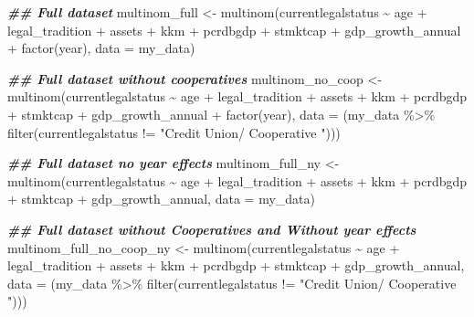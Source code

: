 \documentclass[a4paper,nobind]{templates/ociamthesis}
\newenvironment{Shaded}{\begin{snugshade}}{\end{snugshade}}
\newcommand{\AttributeTok}[1]{\textcolor[rgb]{0.77,0.63,0.00}{#1}}
\newcommand{\DocumentationTok}[1]{\textcolor[rgb]{0.56,0.35,0.01}{\textbf{\textit{#1}}}}
\newcommand{\FunctionTok}[1]{\textcolor[rgb]{0.00,0.00,0.00}{#1}}
\newcommand{\NormalTok}[1]{#1}
\newcommand{\OtherTok}[1]{\textcolor[rgb]{0.56,0.35,0.01}{#1}}
\newcommand{\SpecialCharTok}[1]{\textcolor[rgb]{0.00,0.00,0.00}{#1}}
\newcommand{\StringTok}[1]{\textcolor[rgb]{0.31,0.60,0.02}{#1}}
\renewenvironment{Shaded}
{
  \vspace{10pt}%
  \begin{snugshade}%
}{%
  \end{snugshade}%
  \vspace{8pt}%
}
\begin{document}
\begin{Shaded}
\begin{Highlighting}[]
\DocumentationTok{\#\# Full dataset}
\NormalTok{multinom\_full }\OtherTok{\textless{}{-}} \FunctionTok{multinom}\NormalTok{(currentlegalstatus }\SpecialCharTok{\textasciitilde{}}\NormalTok{ age }\SpecialCharTok{+}\NormalTok{ legal\_tradition }\SpecialCharTok{+}\NormalTok{ assets }\SpecialCharTok{+}\NormalTok{ kkm }\SpecialCharTok{+}\NormalTok{ pcrdbgdp }\SpecialCharTok{+}\NormalTok{ stmktcap }\SpecialCharTok{+}\NormalTok{ gdp\_growth\_annual }\SpecialCharTok{+} \FunctionTok{factor}\NormalTok{(year), }\AttributeTok{data =}\NormalTok{ my\_data)}

\DocumentationTok{\#\# Full dataset without cooperatives}
\NormalTok{multinom\_no\_coop }\OtherTok{\textless{}{-}} \FunctionTok{multinom}\NormalTok{(currentlegalstatus }\SpecialCharTok{\textasciitilde{}}\NormalTok{ age }\SpecialCharTok{+}\NormalTok{ legal\_tradition }\SpecialCharTok{+}\NormalTok{ assets }\SpecialCharTok{+}\NormalTok{ kkm }\SpecialCharTok{+}\NormalTok{ pcrdbgdp }\SpecialCharTok{+}\NormalTok{ stmktcap }\SpecialCharTok{+}\NormalTok{ gdp\_growth\_annual }\SpecialCharTok{+} \FunctionTok{factor}\NormalTok{(year), }\AttributeTok{data =}\NormalTok{ (my\_data }\SpecialCharTok{\%\textgreater{}\%} \FunctionTok{filter}\NormalTok{(currentlegalstatus }\SpecialCharTok{!=} \StringTok{"Credit Union/ Cooperative "}\NormalTok{)))}

\DocumentationTok{\#\# Full dataset no year effects}
\NormalTok{multinom\_full\_ny }\OtherTok{\textless{}{-}} \FunctionTok{multinom}\NormalTok{(currentlegalstatus }\SpecialCharTok{\textasciitilde{}}\NormalTok{ age }\SpecialCharTok{+}\NormalTok{ legal\_tradition }\SpecialCharTok{+}\NormalTok{ assets }\SpecialCharTok{+}\NormalTok{ kkm }\SpecialCharTok{+}\NormalTok{ pcrdbgdp }\SpecialCharTok{+}\NormalTok{ stmktcap }\SpecialCharTok{+}\NormalTok{ gdp\_growth\_annual, }\AttributeTok{data =}\NormalTok{ my\_data)}

\DocumentationTok{\#\# Full dataset without Cooperatives and Without year effects}
\NormalTok{multinom\_full\_no\_coop\_ny }\OtherTok{\textless{}{-}} \FunctionTok{multinom}\NormalTok{(currentlegalstatus }\SpecialCharTok{\textasciitilde{}}\NormalTok{ age }\SpecialCharTok{+}\NormalTok{ legal\_tradition }\SpecialCharTok{+}\NormalTok{ assets }\SpecialCharTok{+}\NormalTok{ kkm }\SpecialCharTok{+}\NormalTok{ pcrdbgdp }\SpecialCharTok{+}\NormalTok{ stmktcap }\SpecialCharTok{+}\NormalTok{ gdp\_growth\_annual, }\AttributeTok{data =}\NormalTok{ (my\_data }\SpecialCharTok{\%\textgreater{}\%} \FunctionTok{filter}\NormalTok{(currentlegalstatus }\SpecialCharTok{!=} \StringTok{"Credit Union/ Cooperative "}\NormalTok{)))}
\end{Highlighting}
\end{Shaded}
\end{document}
